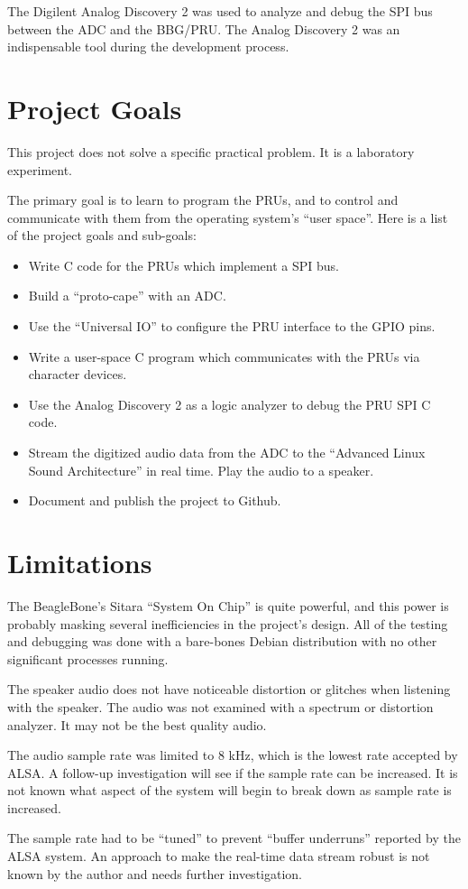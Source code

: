 The Digilent Analog Discovery 2 was used to analyze and debug the SPI bus between the ADC and the BBG/PRU.  The Analog Discovery 2 was an indispensable tool during the development process.

\section{Project Goals}

This project does not solve a specific practical problem.  It is a laboratory experiment.

The primary goal is to learn to program the PRUs, and to control and communicate with them from the operating system's ``user space''.  Here is a list of the project goals and sub-goals:

\begin{itemize}
	\item Write C code for the PRUs which implement a SPI bus.
	\item Build a ``proto-cape'' with an ADC.
	\item Use the ``Universal IO'' to configure the PRU interface to the GPIO pins.
	\item Write a user-space C program which communicates with the PRUs via character devices.
	\item Use the Analog Discovery 2 as a logic analyzer to debug the PRU SPI C code.
	\item Stream the digitized audio data from the ADC to the ``Advanced Linux Sound Architecture'' in real time.  Play the audio to a speaker.
	\item Document and publish the project to Github.
\end{itemize}

\section{Limitations}

The BeagleBone's Sitara ``System On Chip'' is quite powerful, and this power is probably masking several inefficiencies in the project's design.  All of the testing and debugging was done with a bare-bones Debian distribution with no other significant processes running.

The speaker audio does not have noticeable distortion or glitches when listening with the speaker.  The audio was not examined with a spectrum or distortion analyzer.  It may not be the best quality audio.

The audio sample rate was limited to 8 kHz, which is the lowest rate accepted by ALSA.  A follow-up investigation will see if the sample rate can be increased.  It is not known what aspect of the system will begin to break down as sample rate is increased.

The sample rate had to be ``tuned'' to prevent ``buffer underruns'' reported by the ALSA system.  An approach to make the real-time data stream robust is not known by the author and needs further investigation.


